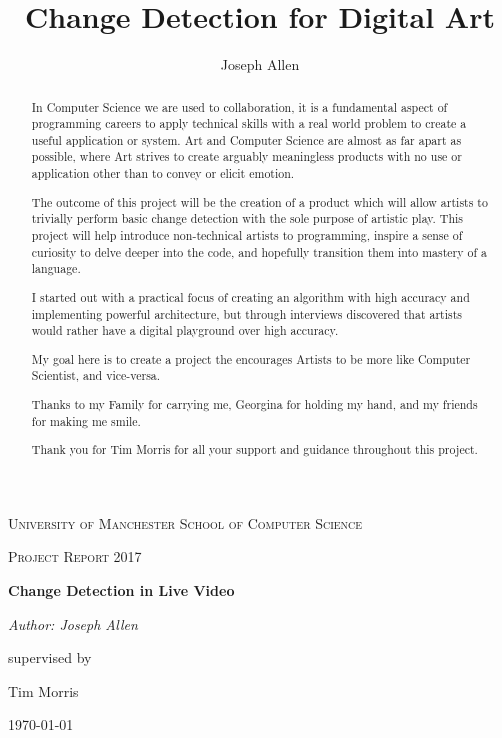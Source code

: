 \documentclass[a4paper]{report}
\title{Change Detection for Digital Art}
\author{Joseph Allen}
\begin{document}
\begin{titlepage}
	\centering
	{\scshape\LARGE University of Manchester School of Computer Science \par}
	\vspace{1cm}
	{\scshape\Large Project Report 2017\par}
	\vspace{1.5cm}
	{\huge\bfseries Change Detection in Live Video\par}
	\vspace{2cm}
	{\Large\itshape Author: Joseph Allen\par}
	supervised by\par
	Tim Morris

	\vfill

	{\large \today\par}
\end{titlepage}

\begin{abstract}
In Computer Science we are used to collaboration, it is a fundamental aspect of programming careers to apply technical skills with a real world problem to create a useful application or system. Art and Computer Science are almost as far apart as possible, where Art strives to create arguably meaningless products with no use or application other than to convey or elicit emotion. 

The outcome of this project will be the creation of a product which will allow artists to trivially perform basic change detection with the sole purpose of artistic play. This project will help introduce non-technical artists to programming, inspire a sense of curiosity to delve deeper into the code, and hopefully transition them into mastery of a language.

I started out with a practical focus of creating an algorithm with high accuracy and implementing powerful architecture, but through interviews discovered that artists would rather have a digital playground over high accuracy.

My goal here is to create a project the encourages Artists to be more like Computer Scientist, and vice-versa.
\end{abstract}

\renewcommand{\abstractname}{Acknowledgements}
\begin{abstract}
Thanks to my Family for carrying me, Georgina for holding my hand, and my friends for making me smile.


Thank you for Tim Morris for all your support and guidance throughout this project.
\end{abstract}
\end{document}
